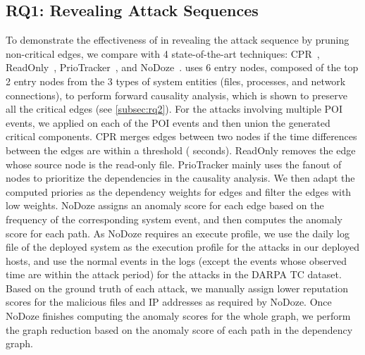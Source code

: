



\subsection{RQ1: Revealing Attack Sequences}
\label{subsec:rq1}
To demonstrate the effectiveness of \tool in revealing the attack sequence by pruning non-critical edges, we compare \tool with 4 state-of-the-art techniques: CPR~\cite{reduction}, ReadOnly~\cite{loggc}, PrioTracker~\cite{liu2018priotracker}, and NoDoze~\cite{hassan2019nodoze}. 
\tool uses 6 entry nodes, composed of the top 2 entry nodes from the 3 types of system entities (\ie files, processes, and network connections), to perform forward causality analysis, which is shown to preserve all the critical edges (see \cref{subsec:rq2}).
For the attacks involving multiple POI events, we applied \tool on each of the POI events and then union the generated critical components. 
CPR merges edges between two nodes if the time differences between the edges are within a threshold ( seconds).
ReadOnly removes the edge whose source node is the read-only file. 
PrioTracker mainly uses the fanout of nodes to prioritize the dependencies in the causality analysis. 
We then adapt the computed priories as the dependency weights for edges and filter the edges with low weights.
NoDoze assigns an anomaly score for each edge based on the frequency of the corresponding system event, and then computes the anomaly score for each path. 
As NoDoze requires an execute profile, we use the daily log file of the deployed system as the execution profile for the attacks in our deployed hosts,
and use the normal events in the logs (except the events whose observed time are within the attack period) for the attacks in the DARPA TC dataset.
Based on the ground truth of each attack, we manually assign lower reputation scores for the malicious files and IP addresses as required by NoDoze.
Once NoDoze finishes computing the anomaly scores for the whole graph, we perform the graph reduction based on the anomaly score of each path in the dependency graph. 


